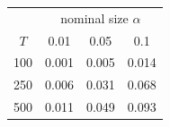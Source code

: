 % 
\begin{tabular}{cccc}
  \hline
  & \multicolumn{3}{c}{nominal size $\alpha$} \\
 $T$ & 0.01 & 0.05 & 0.1 \\
 \hline
100 & 0.001 & 0.005 & 0.014 \\ 
  250 & 0.006 & 0.031 & 0.068 \\ 
  500 & 0.011 & 0.049 & 0.093 \\ 
   \hline
\end{tabular}
